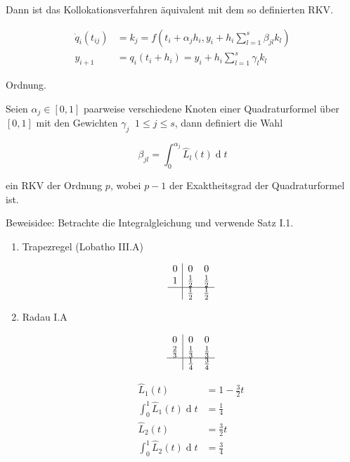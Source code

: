 Dann ist das Kollokationsverfahren äquivalent mit dem so definierten RKV.

\begin{align*}
	\dot{q}_i(t_{ij}) &= k_j = f(t_i + \alpha_j h_i, y_i + h_i \sum_{l=1}^s \beta_{jl} k_l)\\
	y_{i+1} &= q_i(t_i + h_i) = y_i + h_i \sum_{l=1}^s \gamma_l k_l
\end{align*}


\begin{theorem} Ordnung.

	Seien $\alpha_j \in [0, 1]$ paarweise verschiedene Knoten einer Quadraturformel über $[0,1]$ mit den Gewichten $\gamma_j\;\;1 \le j \le s$, dann definiert die Wahl 

	$$\beta_{jl} = \displaystyle\int_0^{\alpha_j}\!\hat{L}_l(t) \operatorname{d}t$$

	ein RKV der Ordnung $p$, wobei $p-1$ der Exaktheitsgrad der Quadraturformel ist.
\end{theorem}

Beweisidee: Betrachte die Integralgleichung und verwende Satz I.1.

\begin{example}\*
	\begin{enumerate}
		\item Trapezregel (Lobatho III.A)
		
			$$\begin{array}{c|cc}
				0 & 0 & 0\\
				1 & \frac{1}{2} & \frac{1}{2}\\
				\hline
				  & \frac{1}{2} & \frac{1}{2}
			\end{array}$$
		\item Radau I.A
		
			$$\begin{array}{c|cc}
				0 & 0 & 0\\
				\frac{2}{3} & \frac{1}{3} & \frac{1}{3}\\
				\hline
				  & \frac{1}{4} & \frac{3}{4}
			\end{array}$$

			\begin{align*}
				\hat{L}_1(t) &= 1 - \frac{3}{2}t\\
				\int_0^1\!\hat{L}_1(t) \operatorname{d}t &= \frac{1}{4}\\
				\hat{L}_2(t) &= \frac{3}{2}t\\
				\int_0^1\!\hat{L}_2(t) \operatorname{d}t &= \frac{3}{4}\\
			\end{align*}
			
	\end{enumerate}
\end{example}

